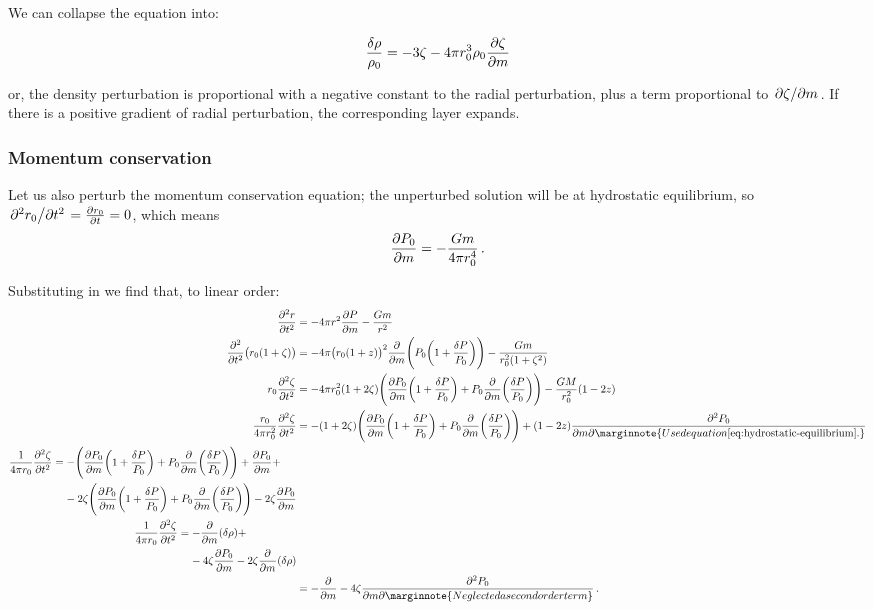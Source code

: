 \documentclass[main.tex]{subfiles}
\begin{document}
We can collapse the equation into:

\begin{equation}
  \frac{\delta \rho}{\rho_0} =
  - 3 \zeta - 4 \pi r_0^3 \rho_0 \pdv{\zeta}{m}
\end{equation}

or, the density perturbation is proportional with a negative constant to the radial perturbation, plus a term proportional to \(\pdv*{\zeta}{m}\).
If there is a positive gradient of radial perturbation, the corresponding layer expands.

\subsubsection{Momentum conservation}

Let us also perturb the momentum conservation equation; the unperturbed solution will be at hydrostatic equilibrium, so \(\pdv*[2]{r_0}{t} = \pdv{r_0 }{t} =0 \), which means 
%
\begin{align} \label{eq:hydrostatic-equilibrium}
\pdv{P_0 }{m} = - \frac{Gm}{4 \pi r_0^{4}}
\,.
\end{align}

Substituting in we find that, to linear order: 
%
\begin{align}
\pdv[2]{r}{t} &= - 4 \pi r^2 \pdv{P}{m} - \frac{Gm}{r^2} \\
\pdv[2]{}{t} \qty(r_0 \qty(1 + \zeta )) 
&= 
- 4 \pi \qty(r_0 (1+z))^2 \pdv{}{m} \qty(P_0 \qty(1 + \frac{ \delta P }{P_0 })) - \frac{Gm}{r_0^2 (1 + \zeta^2)} 
\\
r_0 \pdv[2]{\zeta }{t} 
&=
- 4 \pi r_0^2 \qty(1 + 2 \zeta )
\qty(\pdv{P_0 }{m} \qty(1 + \frac{ \delta P}{P_0 }) + P_0 \pdv{}{m} \qty(\frac{ \delta P}{P_0 }))
- \frac{GM}{r_0^2} \qty(1 - 2z) 
\\
\frac{r_0}{4 \pi r_0^2} \pdv[2]{\zeta }{t} &= - \qty(1 + 2 \zeta )
\qty(\pdv{P_0 }{m} \qty(1 + \frac{ \delta P}{P_0 }) + P_0 \pdv{}{m} \qty(\frac{ \delta P}{P_0 }))
+ \qty(1 - 2z) \pdv{P_0 }{m} \marginnote{Used equation \eqref{eq:hydrostatic-equilibrium}.} \\ 
\begin{split}
\frac{1}{4 \pi r_0} \pdv[2]{\zeta }{t} &= 
- \qty(\pdv{P_0 }{m} \qty(1 + \frac{ \delta P}{P_0 }) + P_0 \pdv{}{m} \qty(\frac{ \delta P}{P_0 })) + \pdv{P_0 }{m} + \\
&\phantom{=}\ - 2\zeta \qty(\pdv{P_0 }{m} \qty(1 + \frac{ \delta P}{P_0 }) + P_0 \pdv{}{m} \qty(\frac{ \delta P}{P_0 }))
- 2 \zeta \pdv{P_0 }{m} 
\end{split} \\
\begin{split}
\frac{1}{4 \pi r_0} \pdv[2]{\zeta }{t} &= 
- \pdv{}{m} \qty(\delta \rho ) + \\
&\phantom{=}\ 
- 4 \zeta \pdv{P_0 }{m}
- 2\zeta \pdv[]{}{m} \qty(\delta \rho )
\end{split} \\
&= - \pdv{}{m} (\delta \rho) - 4 \zeta \pdv{P_0 }{m} \marginnote{Neglected a second order term} 
\,.
\end{align}
%
\end{document}
